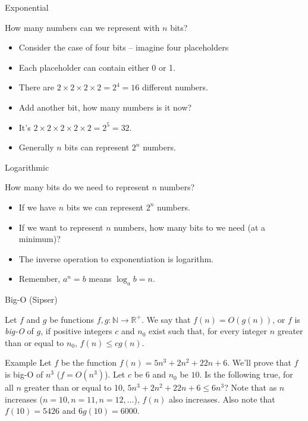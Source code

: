   
\begin{frame}{Exponential}
  \begin{exampleblock}{How many numbers can we represent with $n$ bits?}
    \begin{itemize}
      \item Consider the case of four bits -- imagine four placeholders \textbf{}\textbf{}\textbf{}\textbf{}
      \item Each placeholder can contain either 0 or 1.
      \item There are $2 \times 2 \times 2 \times 2 = 2^4 = 16$ different numbers.
      \item Add another bit, how many numbers is it now?
      \item It's $2 \times 2 \times 2 \times 2 \times 2 = 2^5 = 32$.
      \item Generally $n$ bits can represent $2^n$ numbers.
    \end{itemize}
  \end{exampleblock}
\end{frame}
  
  
\begin{frame}{Logarithmic}
  \begin{exampleblock}{How many bits do we need to represent $n$ numbers?}
    \begin{itemize}
      \item If we have $n$ bits we can represent $2^n$ numbers.
      \item If we want to represent $n$ numbers, how many bits to we need (at a minimum)?
      \item The inverse operation to exponentiation is logarithm.
      \item Remember, $a^n = b$ means $\log_a b = n$.
    \end{itemize}
  \end{exampleblock}
\end{frame}
  
\begin{frame}{Big-O (Sipser)}
  \begin{definition}
    Let $f$ and $g$ be functions $f,g: \mathbb{N} \rightarrow \mathbb{R}^+$.
    We say that $f(n) = O(g(n))$, or $f$ is \emph{big-O} of $g$, if positive integers $c$ and $n_0$ exist such that, for every integer $n$ greater than or equal to $n_0$, $f(n) \le cg(n)$.
  \end{definition}
  \begin{exampleblock}{Example}
    Let $f$ be the function $f(n) = 5n^3 + 2n^2 + 22n + 6$.
    We'll prove that $f$ is big-O of $n^3$ ($f = O(n^3)$).
    Let $c$ be $6$ and $n_0$ be $10$.
    Is the following true, for all $n$ greater than or equal to 10, $5n^3 + 2n^2 + 22n + 6 \le 6n^3$?
    Note that as $n$ increases ($n=10,n=11,n=12,\ldots$), $f(n)$ also increases.
    Also note that $f(10) = 5426$ and $6g(10) = 6000$.
  \end{exampleblock}
\end{frame}
  
